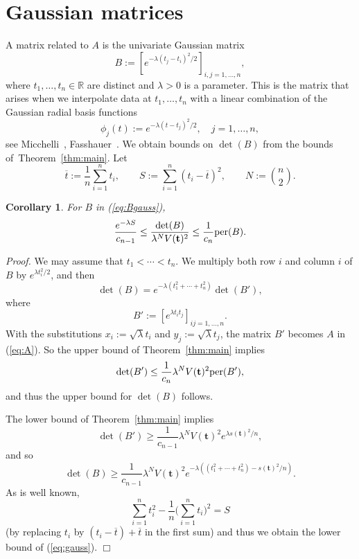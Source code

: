 \documentclass[12pt]{article}
\newcommand{\RR}{\mathbb{R}}
\def\bft{\mathbf{t}}
\def\tbar{\overline{t}}
\def\per{{\rm per}}
\newtheorem{corollary}{Corollary}
\newenvironment{proof}{\begin{trivlist}\item[]{\emph{Proof.}}}
               {\hfill$\Box$\end{trivlist}}
\begin{document}
\section{Gaussian matrices}\label{sec:gaussian}

A matrix related to $A$ is the univariate Gaussian matrix
\begin{equation}\label{eq:Bgauss}
 B := [e^{-\lambda(t_j-t_i)^2/2}]_{i,j=1,\ldots,n},
\end{equation}
where $t_1,\ldots,t_n \in \RR$ are distinct and
$\lambda > 0$ is a parameter. This is the matrix that
arises when we interpolate
data at $t_1,\ldots,t_n$ with a linear combination of
the Gaussian radial basis functions
\begin{equation}\label{eq:gaussians}
\phi_j(t) := e^{-\lambda(t-t_j)^2/2}, \quad j=1,\ldots,n,
\end{equation}
see Micchelli~\cite{Micchelli:1986}, Fasshauer~\cite{Fasshauer:2011}.
We obtain bounds on $\det(B)$
from the bounds of~Theorem~\ref{thm:main}.
Let
$$ \overline{t} := \frac{1}{n} \sum_{i=1}^n t_i, \qquad
S := \sum_{i=1}^n (t_i - \overline{t})^2, \qquad
N := \binom{n}{2}. $$
\begin{corollary}\label{cor:gauss}
For $B$ in (\ref{eq:Bgauss}),
\begin{equation}\label{eq:gauss}
\frac{e^{-\lambda S}}{c_{n-1}} \le
\frac{\det(B)}{\lambda^N V(\bft)^2}
\le \frac{1}{c_n} \per(B).
\end{equation}
\end{corollary}

\begin{proof}
We may assume that $t_1 < \cdots < t_n$.
We multiply both row $i$ and column $i$ of $B$ by $e^{\lambda t_i^2/2}$,
and then
$$ \det(B) = e^{-\lambda(t_1^2 + \cdots + t_n^2)} \det(B'), $$
where
$$ B' := [e^{\lambda t_it_j}]_{ij=1,\ldots,n}. $$
With the substitutions $x_i := \sqrt{\lambda}t_i$ and
$y_j := \sqrt{\lambda}t_j$, the matrix $B'$ becomes $A$ in (\ref{eq:A}).
So the upper bound of Theorem~\ref{thm:main} implies
	$$ \det(B') \le \frac{1}{c_n} \lambda^N V(\bft)^2 \per(B'), $$
and thus the upper bound for $\det(B)$ follows.

The lower bound of Theorem~\ref{thm:main} implies
$$ \det(B') \ge \frac{1}{c_{n-1}} \lambda^N V(\bft)^2
e^{\lambda s(\bft)^2/n}, $$
and so
$$ \det(B) \ge \frac{1}{c_{n-1}} \lambda^N V(\bft)^2
e^{-\lambda ((t_1^2 + \cdots + t_n^2)- s(\bft)^2/n)}.
$$
As is well known,
$$ \sum_{i=1}^n t_i^2 - \frac{1}{n} \Big(\sum_{i=1}^n t_i \Big)^2 = S $$
(by replacing $t_i$ by $(t_i-\tbar) + \tbar$ in the first sum)
and thus we obtain the lower bound of (\ref{eq:gauss}).
\end{proof}
\end{document}
